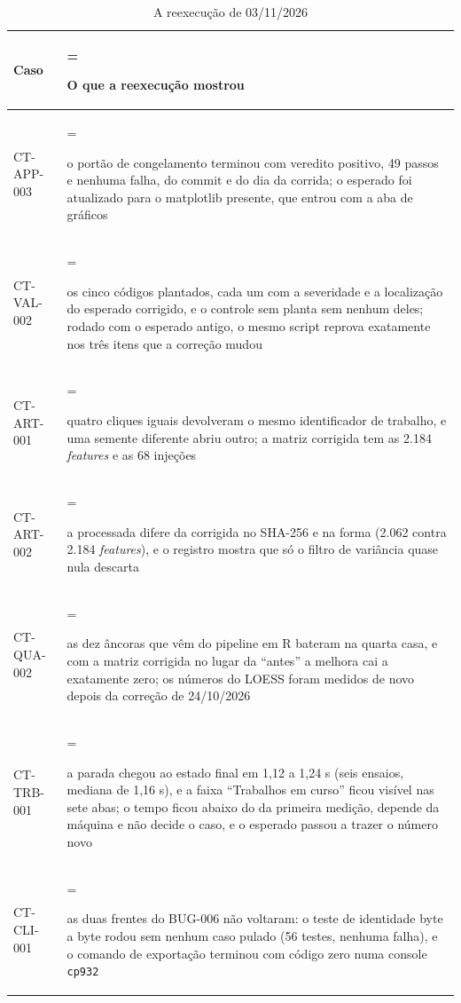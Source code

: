 \begin{table}[htbp]
\centering
\caption{A reexecução de 03/11/2026}\label{tab:5-3a}
\normalsize
\begin{tabularx}{\linewidth}{|l|>{\hsize=1\hsize\linewidth=\hsize\raggedright\arraybackslash\hspace{0pt}}X|}
\hline
\textbf{Caso} & \textbf{O que a reexecução mostrou} \\
\hline
CT-APP-003 & o portão de congelamento terminou com veredito positivo, 49 passos e nenhuma falha, do commit e do dia da corrida; o esperado foi atualizado para o matplotlib presente, que entrou com a aba de gráficos \\ \hline
CT-VAL-002 & os cinco códigos plantados, cada um com a severidade e a localização do esperado corrigido, e o controle sem planta sem nenhum deles; rodado com o esperado antigo, o mesmo script reprova exatamente nos três itens que a correção mudou \\ \hline
CT-ART-001 & quatro cliques iguais devolveram o mesmo identificador de trabalho, e uma semente diferente abriu outro; a matriz corrigida tem as 2.184 \textit{features} e as 68 injeções \\ \hline
CT-ART-002 & a processada difere da corrigida no SHA-256 e na forma (2.062 contra 2.184 \textit{features}), e o registro mostra que só o filtro de variância quase nula descarta \\ \hline
CT-QUA-002 & as dez âncoras que vêm do pipeline em R bateram na quarta casa, e com a matriz corrigida no lugar da ``antes'' a melhora cai a exatamente zero; os números do LOESS foram medidos de novo depois da correção de 24/10/2026 \\ \hline
CT-TRB-001 & a parada chegou ao estado final em 1,12 a 1,24 s (seis ensaios, mediana de 1,16 s), e a faixa ``Trabalhos em curso'' ficou visível nas sete abas; o tempo ficou abaixo do da primeira medição, depende da máquina e não decide o caso, e o esperado passou a trazer o número novo \\ \hline
CT-CLI-001 & as duas frentes do BUG-006 não voltaram: o teste de identidade byte a byte rodou sem nenhum caso pulado (56 testes, nenhuma falha), e o comando de exportação terminou com código zero numa console \texttt{cp932} \\ \hline
\end{tabularx}
\end{table}

